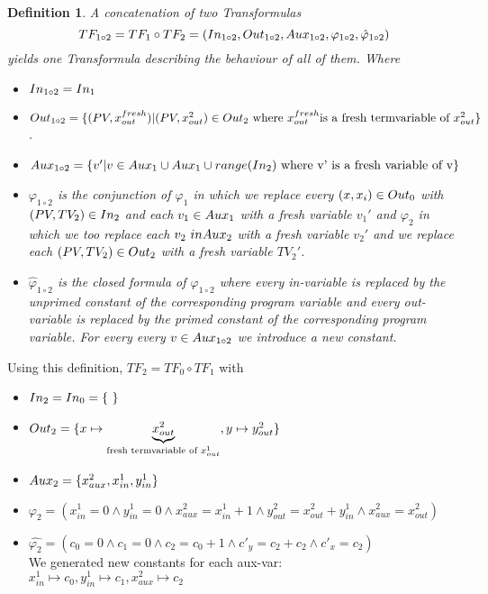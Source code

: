 \documentclass{article}
\newtheorem{mydef}{Definition}
\newcommand\mycom[1]{}
\newcommand\mycom[1]{#1}
\newcommand{\jwl}[1]{\mycom{\todo[color=blue!40,inline,caption={Beschreibung},nolist]{\small #1}}}
\begin{document}
	\begin{mydef}
		A concatenation of two Transformulas 
		\begin{equation*}
		TF_{1 \circ 2} = TF_1 \circ TF_2 = (In_{1 \circ 2}, Out_{1 \circ 2}, Aux_{1 \circ 2}, \varphi_{1 \circ 2}, \hat{\varphi}_{1 \circ 2})
		\end{equation*}  yields one Transformula describing the behaviour of all of them. Where \\
		\jwl{Are in vars fresh?}
		\begin{itemize}
			\item $In_{1 \circ 2} = In_1$
			\item $Out_{1 \circ 2} = \{ (PV, x_{out}^{fresh}) | (PV, x_{out}^{2}) \in Out_2 \text{ where } x_{out}^{fresh} \text{is a fresh termvariable of } x_{out}^2 \}$.
			\item $Aux_{1 \circ 2} = \{ v' | v \in Aux_1 \cup Aux_1 \cup range(In_2) \text{ where v' is a fresh variable of v} \}$
			\item $\varphi_{1 \circ 2}$ is the conjunction of $\varphi_1$ in which we replace every $(x, x_i) \in Out_0$ with $(PV, TV_2) \in In_2$ and each $v_1 \in Aux_1$ with a fresh variable $v_1'$ and $\varphi_2$ in which we too replace each $v_2 \ in Aux_2$ with a fresh variable $v_2'$ and we replace each $(PV, TV_2) \in Out_2$ with a fresh variable $TV_2'$.
			\item $\hat{\varphi}_{1 \circ 2}$ is the closed formula of $\varphi_{1 \circ 2}$ where every in-variable is replaced by the unprimed constant of the corresponding program variable and every out-variable is replaced by the primed constant of the corresponding program variable. For every every $v \in Aux_{1 \circ 2}$ we introduce a new constant.
		\end{itemize}
	\end{mydef}
		
	\smallskip
	
	Using this definition, $TF_2 = TF_0 \circ TF_1$ with
	\begin{itemize}
		\item $\invars_2 = \invars_0 = \{ \ \}$
		\item $Out_2 = \{ x \mapsto \underbrace{x_{out}^2}_{\text{fresh termvariable of } x_{out}^1}, y \mapsto y_{out}^2\}$
		\item $Aux_2 = \{ x^2_{aux}, x_{in}^1, y_{in}^1 \} $
		\item $\varphi_2 = (x_{in}^1 = 0 \land y_{in}^1 = 0 \land x_{aux}^2 = x_{in}^1 + 1 \land y_{out}^2 = x_{out}^2 + y_{in}^1 \land x_{aux}^2 = x_{out}^2)$
		\item $\hat{\varphi_2} = (c_0 = 0 \land c_1 = 0 \land c_2 = c_0 + 1 \land c'_y = c_2 + c_2 \land c'_x = c_2)$ \\ We generated new constants for each aux-var: \\
		$x_{in}^1 \mapsto c_0, y_{in}^1 \mapsto c_1, x^2_{aux} \mapsto c_2$
	\end{itemize}
\end{document}
